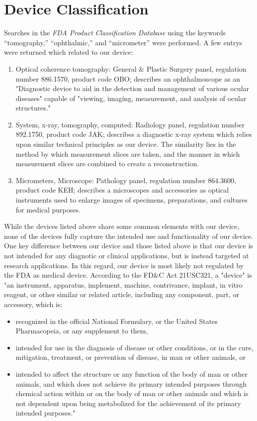 \documentclass{article}
\begin{document}
\section{Device Classification}
\label{sec:protocols}

Searches in the \textit{FDA Product Classification Database} using the
keywords ``tomography,'' ``ophthalmic,'' and ``micrometer'' were
performed. A few entrys were returned which related to our device:

\begin{enumerate}
\item Optical coherence tomography: General \& Plastic Surgery panel,
  regulation number 886.1570, product code OBO; describes an
  ophthalmoscope as an "Diagnostic device to aid in the detection and
  management of various ocular diseases" capable of "viewing, imaging,
  measurement, and analysis of ocular structures."
\item System, x-ray, tomography, computed: Radiology panel, regulation
  number 892.1750, product code JAK; describes a diagnostic x-ray
  system which relies upon similar technical principles as our
  device. The similarity lies in the method by which measurement
  slices are taken, and the manner in which measurement slices are
  combined to create a reconstruction.
\item Micrometers, Microscope: Pathology panel, regulation number
  864.3600, product code KEH; describes a microscopes and accessories
  as optical instruments used to enlarge images of specimens,
  preparations, and cultures for medical purposes.
\end{enumerate}

While the devices listed above share some common elements with our
device, none of the devices fully capture the intended use and
functionality of our device. One key difference between our device and
those listed above is that our device is not intended for any
diagnotic or clinical applications, but is instead targeted at
research applications. In this regard, our device is most likely not
regulated by the FDA as medical device. According to the FD\&C Act
21USC321, a "device" is "an instrument, apparatus, implement, machine,
contrivance, implant, in vitro reagent, or other similar or related
article, including any component, part, or accessory, which is:

\begin{itemize}
\item recognized in the official National Formulary, or the United
  States Pharmacopeia, or any supplement to them,
\item intended for use in the diagnosis of disease or other
  conditions, or in the cure, mitigation, treatment, or prevention of
  disease, in man or other animals, or
\item intended to affect the structure or any function of the body of
  man or other animals, and which does not achieve its primary
  intended purposes through chemical action within or on the body of
  man or other animals and which is not dependent upon being
  metabolized for the achievement of its primary intended purposes."
\end{itemize}
\end{document}
